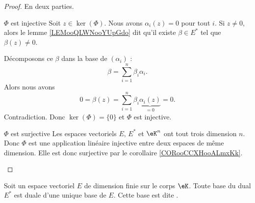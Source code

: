 \begin{proof}
    En deux parties.
    \begin{subproof}
        \item[\( \Phi\) est injective]
            Soit \( z\in \ker(\Phi)\). Nous avons \( \alpha_i(z)=0\) pour tout \( i\). Si \( z\neq 0\), alors le lemme \ref{LEMooQLWNooYUpGdo} dit qu'il existe \( \beta\in E^*\) tel que \( \beta(z)\neq 0\).

    Décomposons ce \( \beta\) dans la base de \( (\alpha_i)\) :
    \begin{equation}
        \beta=\sum_{i=1}^n\beta_i\alpha_i.
    \end{equation}
    Alors nous avons
    \begin{equation}
        0=\beta(z)=\sum_{i=1}^n\beta_i\underbrace{\alpha_i(z)}_{=0}=0.
    \end{equation}
    Contradiction. Donc \( \ker(\Phi)=\{ 0 \}\) et \( \Phi\) est injective.

\item[\( \Phi\) est surjective]
    Les espaces vectoriels \( E\), \( E^*\) et \( \eK^n\) ont tout trois dimension \( n\). Donc \( \Phi\) est une application linéaire injective entre deux espaces de même dimension. Elle est donc surjective par le corollaire \ref{CORooCCXHooALmxKk}.
    \end{subproof}
\end{proof}


\begin{propositionDef}       \label{PROPooDBPGooPagbEB}
    Soit un espace vectoriel \( E\) de dimension finie sur le corps \( \eK\). Toute base du dual \( E^*\) est duale d'une unique base de \( E\). Cette base est dite .
\end{propositionDef}

